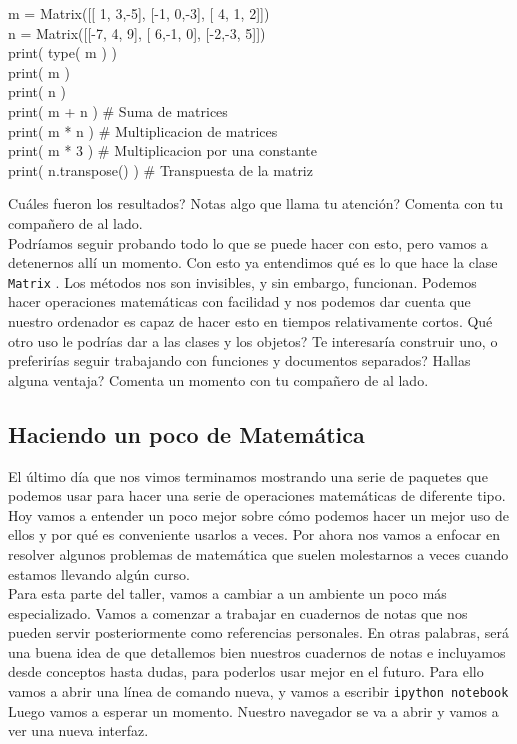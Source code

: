 \documentclass[10pt,letterpaper]{article}
\newcommand{\inlinecode}[1]{
\colorbox{light-gray}{\texttt{#1}}
}
\newenvironment{Code}
{
\begin{lrbox}{\selvestebox}%
\begin{minipage}{\dimexpr\columnwidth-2\fboxsep\relax}
\fontfamily{\ttdefault}\selectfont
}
{\end{minipage}\end{lrbox}%
\begin{center}
\colorbox{light-gray}{\usebox{\selvestebox}}
\end{center}
}
\begin{document}
\begin{Code}
m = Matrix([[ 1, 3,-5], [-1, 0,-3], [ 4, 1, 2]])\\
n = Matrix([[-7, 4, 9], [ 6,-1, 0], [-2,-3, 5]])\\
print( type( m ) )\\
print( m )\\
print( n )\\
print( m + n ) \# Suma de matrices\\
print( m * n ) \# Multiplicacion de matrices\\
print( m * 3 ) \# Multiplicacion por una constante\\
print( n.transpose() ) \# Transpuesta de la matriz
\end{Code}

\noindent Cu\'ales fueron los resultados? Notas algo que llama tu atenci\'on? Comenta con tu compa\~nero de al lado.\\

Podr\'iamos seguir probando todo lo que se puede hacer con esto, pero vamos a detenernos all\'i un momento. Con esto ya entendimos qu\'e es lo que hace la clase \inlinecode{Matrix}. Los m\'etodos nos son invisibles, y sin embargo, funcionan. Podemos hacer operaciones matem\'aticas con facilidad y nos podemos dar cuenta que nuestro ordenador es capaz de hacer esto en tiempos relativamente cortos. Qu\'e otro uso le podr\'ias dar a las clases y los objetos? Te interesar\'ia construir uno, o preferir\'ias seguir trabajando con funciones y documentos separados? Hallas alguna ventaja? Comenta un momento con tu compa\~nero de al lado.

\subsection{Haciendo un poco de Matem\'atica}
El \'ultimo d\'ia que nos vimos terminamos mostrando una serie de paquetes que podemos usar para hacer una serie de operaciones matem\'aticas de diferente tipo. Hoy vamos a entender un poco mejor sobre c\'omo podemos hacer un mejor uso de ellos y por qu\'e es conveniente usarlos a veces. Por ahora nos vamos a enfocar en resolver algunos problemas de matem\'atica que suelen molestarnos a veces cuando estamos llevando alg\'un curso.\\

Para esta parte del taller, vamos a cambiar a un ambiente un poco m\'as especializado. Vamos a comenzar a trabajar en cuadernos de notas que nos pueden servir posteriormente como referencias personales. En otras palabras, ser\'a una buena idea de que detallemos bien nuestros cuadernos de notas e incluyamos desde conceptos hasta dudas, para poderlos usar mejor en el futuro. Para ello vamos a abrir una l\'inea de comando nueva, y vamos a escribir \inlinecode{ipython notebook} Luego vamos a esperar un momento. Nuestro navegador se va a abrir y vamos a ver una nueva interfaz.\\
\end{document}
